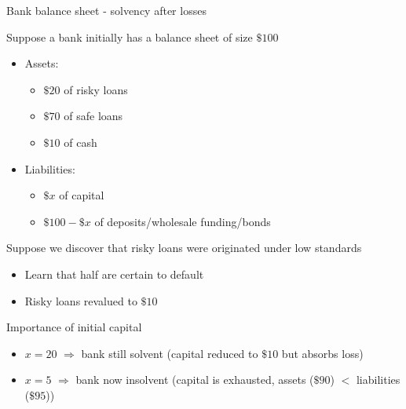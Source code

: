 

\begin{frame}{Bank balance sheet - solvency after losses}

Suppose a bank initially has a balance sheet of size $\$100$
	\begin{itemize}
	\item	Assets:
		\begin{itemize}
		\item	$\$20$ of risky loans
		\item	$\$70$ of safe loans
		\item	$\$10$ of cash
		\end{itemize}
	\item	Liabilities:
		\begin{itemize}
		\item	$\$x$ of capital
		\item	$\$100 - \$x$ of deposits/wholesale funding/bonds
		\end{itemize}
	\end{itemize}
\vspace{2mm}
Suppose we discover that risky loans were originated under low standards
	\begin{itemize}
	\item	Learn that half are certain to default
	\item	Risky loans revalued to $\$10$
	\end{itemize}
\vspace{2mm}
Importance of initial capital
	\begin{itemize}
	\item	$x=20$ $\Rightarrow$ bank still solvent (capital reduced to $\$10$ but absorbs loss)
	\item	$x=5$ $\Rightarrow$ bank now insolvent (capital is exhausted, assets ($\$90$) $<$ liabilities ($\$95$))
	\end{itemize}

\end{frame}



